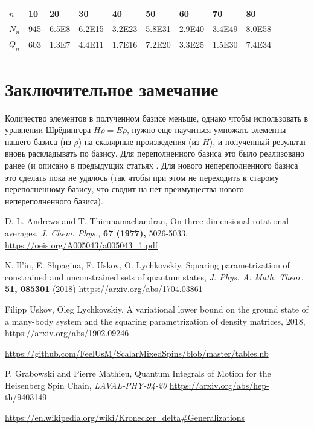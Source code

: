 \documentclass[]{article}
\begin{document}
\begin{tabular}{ |l|l l l l l l l l| }
	\hline
	$n$   & 10  & 20    & 30     & 40     & 50     & 60     & 70     & 80
	\\ \hline
	$N_n$ & 945 & 6.5E8 & 6.2E15 & 3.2E23 & 5.8E31 & 2.9E40 & 3.4E49 & 8.0E58
	\\ %
	$Q_n$ & 603 & 1.3E7 & 4.4E11 & 1.7E16 & 7.2E20 & 3.3E25 & 1.5E30 & 7.4E34
	\\ \hline
\end{tabular}

\section{Заключительное замечание}
Количество элементов в полученном базисе меньше,
однако чтобы использовать в уравнении Шрёдингера $H \rho = E \rho$, нужно еще научиться умножать элементы нашего базиса (из $\rho$) на скалярные произведения (из $H$), и полученный результат вновь раскладывать по базису.
Для переполненного базиса это было реализовано ранее (и описано в предыдущих статьях \cite{variational}.
Для нового непереполненного базиса это сделать пока не удалось (так чтобы при этом не переходить к старому переполненному базису, что сводит на нет преимущества нового непереполненного базиса).

\begin{thebibliography}{3}
	D. L. Andrews and T. Thirunamachandran, On three-dimensional rotational averages, {\it J. Chem. Phys.,} {\bf 67 (1977),} 5026-5033.
	\href{https://oeis.org/A005043/a005043_1.pdf}
	{https://oeis.org/A005043/a005043\_1.pdf}
	
	 N. Il'in, E. Shpagina, F. Uskov, O. Lychkovskiy, 
	Squaring parametrization of constrained and unconstrained sets of quantum states, {\it J. Phys. A: Math. Theor.} {\bf 51, 085301} (2018)
	\href{https://arxiv.org/abs/1704.03861}{https://arxiv.org/abs/1704.03861}
	
	Filipp Uskov, Oleg Lychkovskiy, A variational lower bound on the ground state of a 	many-body system and the squaring parametrization of density matrices, 2018, \href{https://arxiv.org/abs/1902.09246}{https://arxiv.org/abs/1902.09246}
	
	
	\href{https://github.com/FeelUsM/ScalarMixedSpins/blob/master/tables.nb}
	{https://github.com/FeelUsM/ScalarMixedSpins/blob/master/tables.nb}
	
	P. Grabowski and Pierre Mathieu, Quantum Integrals of Motion for the Heisenberg Spin Chain, {\it LAVAL-PHY-94-20}
	\href{https://arxiv.org/abs/hep-th/9403149}{https://arxiv.org/abs/hep-th/9403149}
	
	\href{https://en.wikipedia.org/wiki/Kronecker_delta#Generalizations}
	{https://en.wikipedia.org/wiki/Kronecker\_delta\#Generalizations}
	
\end{thebibliography}
\end{document}
